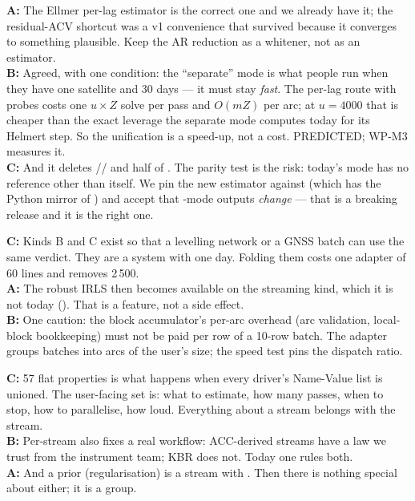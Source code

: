 \begin{panel}
\textbf{A:} The Ellmer per-lag estimator is the correct one and we already have it; the residual-ACV shortcut was a v1 convenience that survived because it converges to something plausible. Keep the AR reduction as a whitener, not as an estimator.\\
\textbf{B:} Agreed, with one condition: the ``separate'' mode is what people run when they have one satellite and 30 days --- it must stay \emph{fast}. The per-lag route with probes costs one $u\times Z$ solve per pass and $O(mZ)$ per arc; at $u=4000$ that is cheaper than the exact leverage the separate mode computes today for its Helmert step. So the unification is a speed-up, not a cost. PREDICTED; WP-M3 measures it.\\
\textbf{C:} And it deletes // and half of . The parity test is the risk: today's  mode has no reference other than itself. We pin the new estimator against  (which has the Python mirror of ) and accept that -mode outputs \emph{change} --- that is a breaking release and it is the right one.
\end{panel}

\begin{panel}
\textbf{C:} Kinds B and C exist so that a levelling network or a GNSS batch can use the same verdict. They are a system with one day. Folding them costs one adapter of 60 lines and removes 2\,500.\\
\textbf{A:} The robust IRLS then becomes available on the streaming kind, which it is not today (). That is a feature, not a side effect.\\
\textbf{B:} One caution: the block accumulator's per-arc overhead (arc validation, local-block bookkeeping) must not be paid per row of a 10-row batch. The adapter groups batches into arcs of the user's size; the speed test pins the dispatch ratio.
\end{panel}

\begin{panel}
\textbf{C:} 57 flat properties is what happens when every driver's Name-Value list is unioned. The user-facing set is: what to estimate, how many passes, when to stop, how to parallelise, how loud. Everything about a stream belongs with the stream.\\
\textbf{B:} Per-stream  also fixes a real workflow: ACC-derived streams have a law we trust from the instrument team; KBR does not. Today one  rules both.\\
\textbf{A:} And a prior (regularisation) is a stream with . Then there is nothing special about  either; it is a group.
\end{panel}

